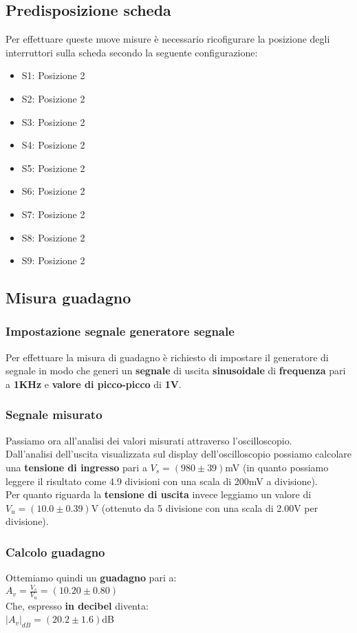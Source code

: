 \documentclass{article}
\begin{document}
\subsection{Predisposizione scheda}
Per effettuare queste nuove misure è necessario ricofigurare la posizione degli interruttori sulla scheda secondo la seguente configurazione:
\begin{itemize}
    \item S1: Posizione 2
    \item S2: Posizione 2
    \item S3: Posizione 2
    \item S4: Posizione 2
    \item S5: Posizione 2
    \item S6: Posizione 2
    \item S7: Posizione 2
    \item S8: Posizione 2
    \item S9: Posizione 2
\end{itemize}
\subsection{Misura guadagno}
\subsubsection{Impostazione segnale generatore segnale}
Per effettuare la misura di guadagno è richiesto di impostare il generatore di segnale in modo che generi un \textbf{segnale} di uscita \textbf{sinusoidale} di \textbf{frequenza} pari a \textbf{1KHz} e \textbf{valore di picco-picco} di \textbf{1V}.

\subsubsection{Segnale misurato}
Passiamo ora all'analisi dei valori misurati attraverso l'oscilloscopio.\\Dall'analisi dell'uscita visualizzata sul display dell'oscilloscopio possiamo calcolare una \textbf{tensione di ingresso} pari a \large $V_s = (980 \pm 39)$mV \normalsize (in quanto possiamo leggere il risultato come 4.9 divisioni con una scala di 200mV a divisione).\\
Per quanto riguarda la \textbf{tensione di uscita} invece leggiamo un valore di \large $V_u = (10.0 \pm 0.39)$V \normalsize (ottenuto da 5 divisione con una scala di 2.00V per divisione).
\subsubsection{Calcolo guadagno}
Ottemiamo quindi un \textbf{guadagno} pari a:\\ \large $A_v = \frac{V_s}{V_u} = (10.20 \pm 0.80)$ \normalsize \\Che, espresso \textbf{in decibel} diventa:\\ \large $ |A_v|_{dB} = (20.2 \pm 1.6)$dB \normalsize
\end{document}
